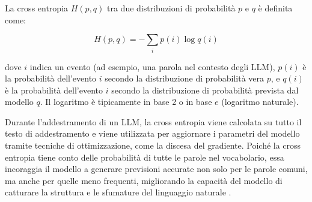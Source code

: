 La cross entropia \(H(p, q)\) tra due distribuzioni di probabilità \(p\) e \(q\) è definita come:

\[H(p, q) = -\sum_{i} p(i) \log q(i)\]

dove \(i\) indica un evento (ad esempio, una parola nel contesto degli LLM), \(p(i)\) è la probabilità dell'evento \(i\) secondo la distribuzione di probabilità vera \(p\), e \(q(i)\) è la probabilità dell'evento \(i\) secondo la distribuzione di probabilità prevista dal modello \(q\). Il logaritmo è tipicamente in base 2 o in base $e$ (logaritmo naturale).

Durante l'addestramento di un LLM, la cross entropia viene calcolata su tutto il testo di addestramento e viene utilizzata per aggiornare i parametri del modello tramite tecniche di ottimizzazione, come la discesa del gradiente. Poiché la cross entropia tiene conto delle probabilità di tutte le parole nel vocabolario, essa incoraggia il modello a generare previsioni accurate non solo per le parole comuni, ma anche per quelle meno frequenti, migliorando la capacità del modello di catturare la struttura e le sfumature del linguaggio naturale \cite{cross_entropy}.

